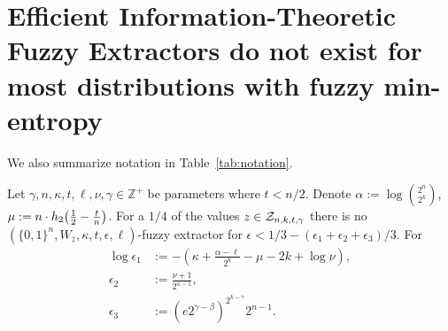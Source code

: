 

\section{Efficient Information-Theoretic Fuzzy Extractors do not exist for most distributions with fuzzy min-entropy}
\label{sec:fe}

We also summarize notation in Table~\ref{tab:notation}.

\begin{theorem}
Let $\gamma, n, \kappa, t, \ell, \nu, \gamma \in\mathbb{Z}^+$ be parameters where $t<n/2$. 
 Denote $\alpha := \log{{2^n\choose 2^k}}$, $\mu :=  n \cdot h_2\!\left(\frac{1}{2} - \frac{t}{n}\right)$.
For a $1/4$ of the values $z\in\mathcal{Z}_{n,k,t,\gamma}$ there is no $(\{0,1\}^n, W_z, \kappa, t, \epsilon, \ell)$-fuzzy extractor for 
$\epsilon<1/3 - (\epsilon_1+\epsilon_2+\epsilon_3)/3.$ 
For 
\begin{align*}\log{\epsilon_1}&:= -\left(\kappa+\frac{\alpha -\ell}{2^k} - \mu -2k+\log{\nu}\right),\\
\epsilon_2&:=\frac{\nu+1}{2^{\kappa-1}},\\
\epsilon_3&:=\left(e2^{\gamma-\beta}\right)^{2^{k-\gamma}}2^{n-1}.
\end{align*}
\label{thm:main theorem}
\end{theorem}

